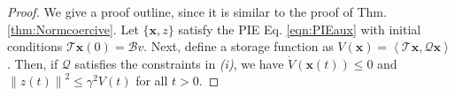 \documentclass[letterpaper, 10 pt, conference]{ieeeconf}
\newcommand{\ip}[2]{\left\langle #1,#2\right\rangle}
\newcommand{\mcl}[1]{\mathcal{#1}}
\newcommand{\mbf}[1]{\mathbf{#1}}
\newcommand{\norm}[1]{\left\lVert #1 \right\rVert}
\theoremstyle{definition}
\begin{document}
\begin{proof}
We give a proof outline, since it is similar to the proof of Thm. \ref{thm:Normcoercive}.
Let $\{\mbf x, z\}$ satisfy the PIE Eq. \eqref{eqn:PIEaux} with initial conditions $\mcl T\mbf x(0)=\mcl Bv$. Next, define a storage function as $V(\mbf x) = \ip{\mcl T\mbf x}{\mcl Q\mbf x}$. Then, if $\mcl Q$ satisfies the constraints in \textit{(i)}, we have
$\dot{V}(\mbf x(t))\le 0$ and $\norm{z(t)}^2\le \gamma^2V(t)$ for all $t>0$.
       
    


\end{proof}
\end{document}
